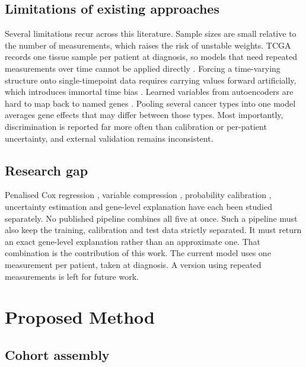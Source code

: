 \documentclass[10pt,a4paper]{article}
\begin{document}
\subsection{Limitations of existing approaches}

Several limitations recur across this literature. Sample sizes are small
relative to the number of measurements, which raises the risk of unstable
weights. TCGA records one tissue sample per patient at diagnosis, so models that
need repeated measurements over time cannot be applied directly
\citep{lee2020dynamic}. Forcing a time-varying structure onto single-timepoint
data requires carrying values forward artificially, which introduces immortal
time bias \citep{suissa2008immortal}. Learned variables from autoencoders are
hard to map back to named genes \citep{chaudhary2018deep}. Pooling several
cancer types into one model averages gene effects that may differ between those
types. Most importantly, discrimination is reported far more often than
calibration or per-patient uncertainty, and external validation remains
inconsistent.

\subsection{Research gap}

Penalised Cox regression \citep{tibshirani1997lasso, simon2011regularization},
variable compression \citep{vanhouwelingen2006crossvalidated}, probability
calibration \citep{niculescu2005predicting}, uncertainty estimation
\citep{lee2020dynamic} and gene-level explanation \citep{hao2019coxpasnet} have
each been studied separately. No published pipeline combines all five at once. Such a pipeline must
also keep the training, calibration and test data strictly separated. It must
return an exact gene-level explanation rather than an approximate one. That
combination is the contribution of this work. The current model uses one measurement per patient,
taken at diagnosis. A version using repeated measurements is left for future
work.

\section{Proposed Method}

\subsection{Cohort assembly}
\end{document}

